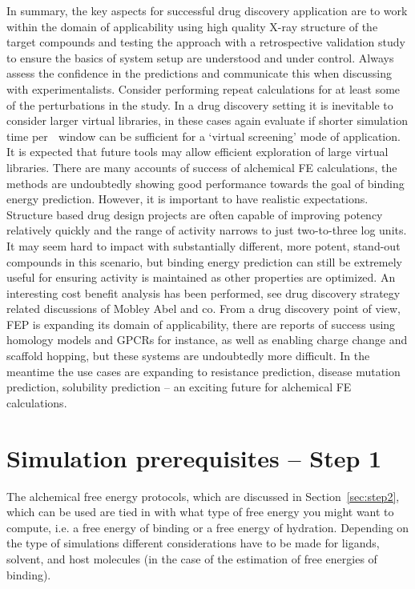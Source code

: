 \documentclass[9pt,bestpractices]{livecoms}
\begin{document}
In summary, the key aspects for successful drug discovery application are to work within the domain of applicability using high quality X-ray structure of the target compounds and testing the approach with a retrospective validation study to ensure the basics of system setup are understood and under control. Always assess the confidence in the predictions and communicate this when discussing with experimentalists. Consider performing repeat calculations for at least some of the perturbations in the study. In a drug discovery setting it is inevitable to consider larger virtual libraries, in these cases again evaluate if shorter simulation time per  window can be sufficient for a ‘virtual screening’ mode of application. It is expected that future tools may allow efficient exploration of large virtual libraries. There are many accounts of success of alchemical FE calculations, the methods are undoubtedly showing good performance towards the goal of binding energy prediction. However, it is important to have realistic expectations. Structure based drug design projects are often capable of improving potency relatively quickly and the range of activity narrows to just two-to-three log units. It may seem hard to impact with substantially different, more potent, stand-out compounds in this scenario, but binding energy prediction can still be extremely useful for ensuring activity is maintained as other properties are optimized. An interesting cost benefit analysis has been performed, see drug discovery strategy related discussions of Mobley Abel and co. From a drug discovery point of view, FEP is expanding its domain of applicability, there are reports of success using homology models and GPCRs for instance, as well as enabling charge change and scaffold hopping, but these systems are undoubtedly more difficult.  In the meantime the use cases are expanding to resistance prediction, disease mutation prediction, solubility prediction – an exciting future for alchemical FE calculations. 




%
%
%
%
\section{Simulation prerequisites -- Step 1}
\label{sec:step1}
The alchemical free energy protocols, which are discussed in Section~\ref{sec:step2}, which can be used are tied in with what type of free energy you might want to compute, i.e. a free energy of binding or a free energy of hydration. Depending on the type of simulations different considerations have to be made for ligands, solvent, and host molecules (in the case of the estimation of free energies of binding).
\end{document}

